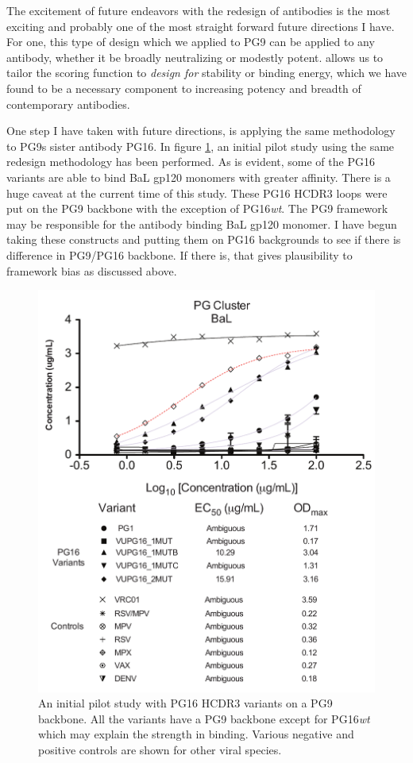 The excitement of future endeavors with the redesign of antibodies is the most exciting and probably one of the most straight forward future directions I have. For one, this type of design which we applied to PG9 can be applied to any antibody, whether it be broadly neutralizing or modestly potent. \rosetta allows us to tailor the scoring function to \textit{design for} stability or binding energy, which we have found to be a necessary component to increasing potency and breadth of contemporary antibodies.

One step I have taken with future directions, is applying the same methodology to PG9s sister antibody PG16. In figure \ref{fig:fig5_4}, an initial pilot study using the same redesign methodology has been performed. As is evident, some of the PG16 variants are able to bind BaL gp120 monomers with greater affinity. There is a huge caveat at the current time of this study. These PG16 HCDR3 loops were put on the PG9 backbone with the exception of PG16\textit{wt}. The PG9 framework may be responsible for the antibody binding BaL gp120 monomer. I have begun taking these constructs and putting them on PG16 backgrounds to see if there is difference in PG9/PG16 backbone. If there is, that gives plausibility to framework bias as discussed above.

\begin{figure}[!t]
   \centering
   \includegraphics[scale=.5]{images/chapter5/figure5_4.pdf}
   \caption[Binding Profile of PG16 Variants]{An initial pilot study with PG16 HCDR3 variants on a PG9 backbone. All the variants have a PG9 backbone except for PG16\textit{wt} which may explain the strength in binding. Various negative and positive controls are shown for other viral species.}
    \label{fig:fig5_4}
\end{figure}

